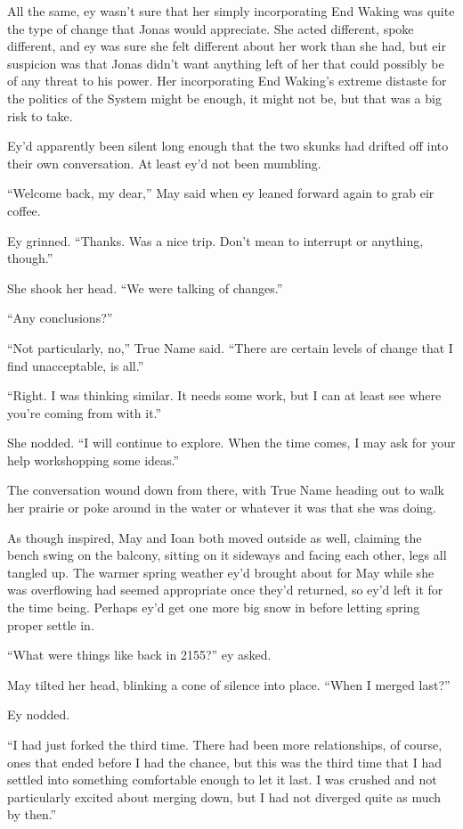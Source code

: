 All the same, ey wasn't sure that her simply incorporating End Waking was quite the type of change that Jonas would appreciate. She acted different, spoke different, and ey was sure she felt different about her work than she had, but eir suspicion was that Jonas didn't want anything left of her that could possibly be of any threat to his power. Her incorporating End Waking's extreme distaste for the politics of the System might be enough, it might not be, but that was a big risk to take.

Ey'd apparently been silent long enough that the two skunks had drifted off into their own conversation. At least ey'd not been mumbling.

``Welcome back, my dear,'' May said when ey leaned forward again to grab eir coffee.

Ey grinned. ``Thanks. Was a nice trip. Don't mean to interrupt or anything, though.''

She shook her head. ``We were talking of changes.''

``Any conclusions?''

``Not particularly, no,'' True Name said. ``There are certain levels of change that I find unacceptable, is all.''

``Right. I was thinking similar. It needs some work, but I can at least see where you're coming from with it.''

She nodded. ``I will continue to explore. When the time comes, I may ask for your help workshopping some ideas.''

The conversation wound down from there, with True Name heading out to walk her prairie or poke around in the water or whatever it was that she was doing.

As though inspired, May and Ioan both moved outside as well, claiming the bench swing on the balcony, sitting on it sideways and facing each other, legs all tangled up. The warmer spring weather ey'd brought about for May while she was overflowing had seemed appropriate once they'd returned, so ey'd left it for the time being. Perhaps ey'd get one more big snow in before letting spring proper settle in.

``What were things like back in 2155?'' ey asked.

May tilted her head, blinking a cone of silence into place. ``When I merged last?''

Ey nodded.

``I had just forked the third time. There had been more relationships, of course, ones that ended before I had the chance, but this was the third time that I had settled into something comfortable enough to let it last. I was crushed and not particularly excited about merging down, but I had not diverged quite as much by then.''

